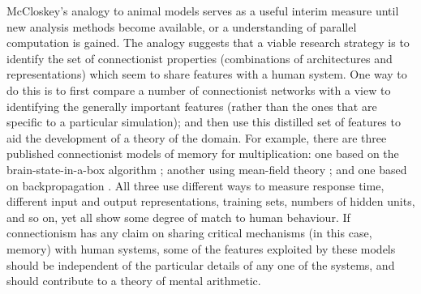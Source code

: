 
McCloskey's analogy to animal models serves as a useful interim measure
until new analysis methods become available, or a understanding of parallel
computation is gained. The analogy suggests that a viable research strategy
is to identify the set of connectionist properties (combinations of
architectures and representations) which seem to share features with a
human system. One way to do this is to first compare a number of
connectionist networks with a view to identifying the generally important
features (rather than the ones that are specific to a particular
simulation); and then  use this distilled set of features to aid the
development of a theory of the domain.  For example, there are three
published connectionist models of memory for multiplication: one based on
the brain-state-in-a-box algorithm \cite{andestud}; another using
mean-field theory \cite{mcclmath}; and one based on backpropagation
\cite{dallmemo}. All three use different ways to measure response time,
different input and output representations, training sets, numbers of
hidden units, and so on, yet all show some degree of match to human
behaviour.  If connectionism has any claim on sharing critical mechanisms
(in this case, memory) with human systems, some of the features exploited
by these models should be independent of the particular details of any one of
the systems, and should contribute to a theory of mental arithmetic.



